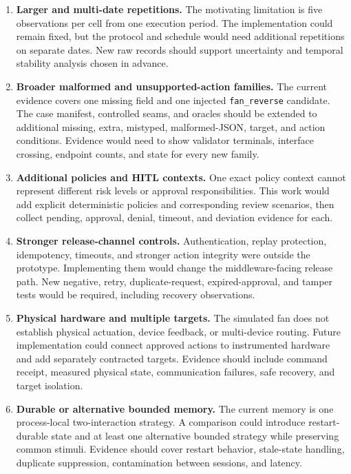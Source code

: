 \begin{enumerate}
\item \textbf{Larger and multi-date repetitions.} The motivating limitation is
five observations per cell from one execution period. The implementation could
remain fixed, but the protocol and schedule would need additional repetitions
on separate dates. New raw records should support uncertainty and temporal
stability analysis chosen in advance.

\item \textbf{Broader malformed and unsupported-action families.} The current
evidence covers one missing field and one injected \texttt{fan\_reverse}
candidate. The case manifest, controlled seams, and oracles should be extended
to additional missing, extra, mistyped, malformed-JSON, target, and action
conditions. Evidence would need to show validator terminals, interface crossing,
endpoint counts, and state for every new family.

\item \textbf{Additional policies and HITL contexts.} One exact policy context
cannot represent different risk levels or approval responsibilities. This work
would add explicit deterministic policies and corresponding review scenarios,
then collect pending, approval, denial, timeout, and deviation evidence for each.

\item \textbf{Stronger release-channel controls.} Authentication, replay
protection, idempotency, timeouts, and stronger action integrity were outside the
prototype. Implementing them would change the middleware-facing release path.
New negative, retry, duplicate-request, expired-approval, and tamper tests would
be required, including recovery observations.

\item \textbf{Physical hardware and multiple targets.} The simulated fan does
not establish physical actuation, device feedback, or multi-device routing.
Future implementation could connect approved actions to instrumented hardware
and add separately contracted targets. Evidence should include command receipt,
measured physical state, communication failures, safe recovery, and target
isolation.

\item \textbf{Durable or alternative bounded memory.} The current memory is one
process-local two-interaction strategy. A comparison could introduce restart-
durable state and at least one alternative bounded strategy while preserving
common stimuli. Evidence should cover restart behavior, stale-state handling,
duplicate suppression, contamination between sessions, and latency.


\end{enumerate}

